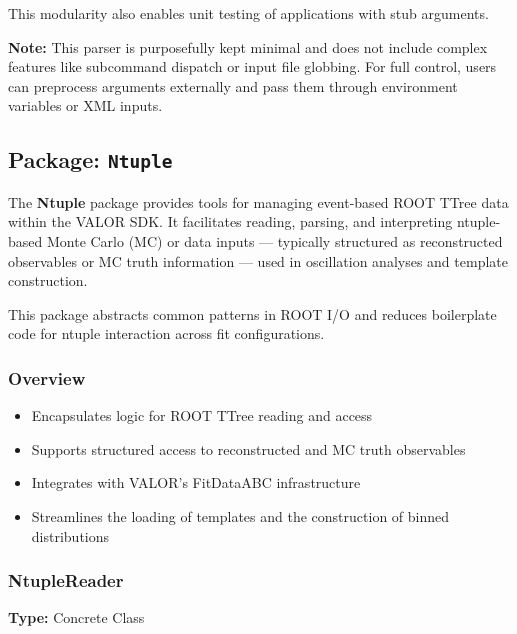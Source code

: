 This modularity also enables unit testing of applications with stub arguments.

\vspace{1em}
\noindent\textbf{Note:} This parser is purposefully kept minimal and does not include complex features like subcommand dispatch or input file globbing. For full control, users can preprocess arguments externally and pass them through environment variables or XML inputs.

%
%
%

\subsection{Package: \texttt{Ntuple}}

The {\color{cadmiumgreen} \textbf{Ntuple}} package provides tools for managing event-based ROOT {\color{cadmiumgreen} TTree} data within the VALOR SDK.  
It facilitates reading, parsing, and interpreting ntuple-based Monte Carlo (MC) or data inputs — typically structured as reconstructed observables or MC truth information — used in oscillation analyses and template construction.

This package abstracts common patterns in ROOT I/O and reduces boilerplate code for ntuple interaction across fit configurations.

\vspace{1em}
\subsubsection*{Overview}

\begin{itemize}
  \item Encapsulates logic for ROOT {\color{cadmiumgreen} TTree} reading and access
  \item Supports structured access to reconstructed and MC truth observables
  \item Integrates with VALOR’s {\color{cadmiumgreen} FitDataABC} infrastructure
  \item Streamlines the loading of templates and the construction of binned distributions
\end{itemize}

\vspace{1em}
\subsubsection*{\color{cadmiumgreen}\bf NtupleReader}

\textbf{Type:} Concrete Class

